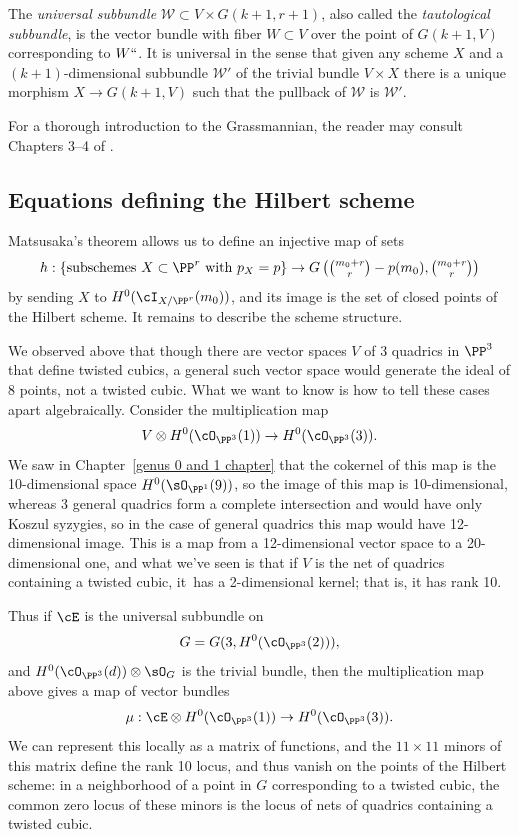 \def\sW{{\mathcal W}}

The \emph{universal subbundle} $\sW \subset V\times G(k+1,r+1)$, also
%
%
called the \emph{tautological subbundle},  is
the vector bundle with fiber
 $W\subset V$ over the point of $G(k+1,V)$ corresponding to $W` `$. It
 is universal in the sense that
 given any scheme $X$ and a $(k+1)$-dimensional subbundle $\sW'$ of
 the trivial bundle $V\times X$
there is a unique morphism $X\to G(k+1,V)$ such that the pullback of $\sW$
is $\sW'$.

For a thorough introduction to the Grassmannian,
the reader may consult
Chapters 3--4 of
\cite{3264}.

\subsection{Equations defining the Hilbert scheme}
\label{eqns of Hilb}

Matsusaka's theorem allows us to define an injective map of sets
%
$$
h : \left\{ \text{subschemes $X \subset \PP^r$ with $p_X=p$} \right\}
\to G\left(\tbinom{m_0+r}{r} - p(m_0),\tbinom{m_0+r}{r} \right)
$$
by sending $X$ to $H^0(\cI_{X/\PP^r}(m_0))$, and its image is the set
of closed points of the Hilbert scheme.
It remains to describe the scheme structure.

We observed above that though there are vector spaces $V$ of 3 quadrics
in $\PP^{3}$ that define
twisted cubics, a general such vector space  would generate the ideal of
8 points,  not a twisted cubic. What we want to know is how to tell
these cases apart algebraically. Consider the multiplication map
$$
V \otimes H^0(\cO_{\PP^3}(1)) \to H^0(\cO_{\PP^3}(3)).
$$
We saw in Chapter~\ref{genus 0 and 1 chapter} that the cokernel of this
map is the 10-dimensional space $H^0(\sO_{\PP^1}(9))$, so the image of
this map is 10-dimensional, whereas
3 general quadrics form a complete intersection and would have only
Koszul syzygies, so
in the case of general quadrics this map would have 12-dimensional image.
This is a map from a 12-dimensional vector space to a 20-dimensional one,
and what we've seen is that if $V$ is the net of quadrics containing a
twisted cubic, it~has a 2-dimensional kernel; that is, it has rank 10.

Thus if $\cE$ is the universal subbundle on
$$G = G(3, H^0(\cO_{\PP^3}(2))),$$
and  $H^0(\cO_{\PP^3}(d))\otimes \sO_G$ is the
trivial bundle, then the multiplication map above gives a map of vector
bundles
$$
\mu: \cE \otimes H^0(\cO_{\PP^3}(1)) \to H^0(\cO_{\PP^3}(3)).
$$
We can represent this locally as a matrix of functions, and the $11\times
11$ minors of this matrix
define the rank 10 locus, and thus vanish on the points of
the Hilbert scheme: in a neighborhood of a point in $G$ corresponding
to a twisted cubic, the common zero locus of these minors is the locus
of nets of quadrics containing a twisted cubic.

